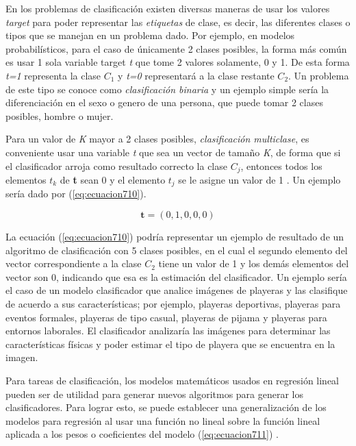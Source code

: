 En los problemas de clasificación existen diversas maneras de usar los valores \textit{target} para poder representar las \textit{etiquetas} de clase, es decir, las diferentes clases o tipos que se manejan en un problema 
dado. Por ejemplo, en modelos probabilísticos, para el caso de únicamente 2 clases posibles, la forma más común es usar 1 sola variable target \textit{t} que tome 2 valores solamente, 0 y 1. De esta forma \textit{t=1} representa la clase \textit{$C_1$} y \textit{t=0} representará a la clase restante \textit{$C_2$}.
Un problema de este tipo se conoce como \textit{clasificación binaria} y un ejemplo simple sería la diferenciación en el sexo o genero de una persona, que puede tomar 2 clases posibles, hombre o mujer.

Para un valor de \textit{K} mayor a 2 clases posibles, \textit{clasificación multiclase}, es conveniente usar una variable \textit{t} que sea un vector de tamaño \textit{K}, de forma que si el clasificador arroja como resultado correcto la clase \textit{$C_j$}, 
entonces todos los elementos \textit{$t_k$} de \textbf{t} sean 0 y el elemento \textit{$t_j$} se le asigne un valor de 1 \cite{bishop}. Un ejemplo sería dado por (\ref{eq:ecuacion710}).

\begin{equation}
	\textbf{t}=(0,1,0,0,0)
	\label{eq:ecuacion710}
\end{equation}


La ecuación (\ref{eq:ecuacion710}) podría representar un ejemplo de resultado de un algoritmo de clasificación con 5 clases posibles, en el cual el segundo elemento del vector correspondiente a la clase \textit{$C_2$} tiene 
un valor de 1 y los demás elementos del vector son 0, indicando que esa es la estimación del clasificador. Un ejemplo sería el caso de un modelo clasificador que analice imágenes de playeras y las clasifique de acuerdo a 
sus características; por ejemplo, playeras deportivas, playeras para eventos formales, playeras de tipo casual, playeras de pijama y playeras para entornos laborales. El clasificador analizaría las imágenes para determinar 
las características físicas y poder estimar el tipo de playera que se encuentra en la imagen.

Para tareas de clasificación, los modelos matemáticos usados en regresión lineal pueden ser de utilidad para generar nuevos algoritmos para generar los clasificadores. Para lograr esto, se puede establecer una generalización 
de los modelos para regresión al usar una función no lineal sobre la función lineal aplicada a los pesos o coeficientes del modelo (\ref{eq:ecuacion711}) \cite{bishop}.

